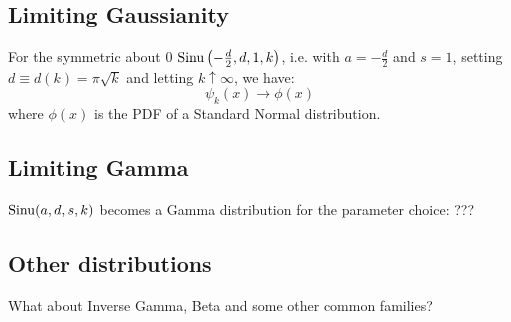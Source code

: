 \subsection{Limiting Gaussianity}
\begin{thm}\label{thm:normality}
	For the symmetric about 0 \sindist{} $\operatorname*{Sinu}\left(-\frac{d}{2}, d, 1, k\right)$, i.e. with $a = -\frac{d}{2}$ and $s=1$, setting $d \equiv d(k)= \pi \sqrt k$ and letting $k \uparrow \infty$, we have:
	\[ \psi_k(x) \to \phi(x)\]
	where $\phi(x)$ is the PDF of a Standard Normal distribution.
\end{thm}

\subsection{Limiting Gamma}
\begin{thm}
	$\operatorname*{Sinu}(a,d,s,k)$ becomes a Gamma distribution for the parameter choice: ???
\end{thm}

\subsection{Other distributions}
What about Inverse Gamma, Beta and some other common families?